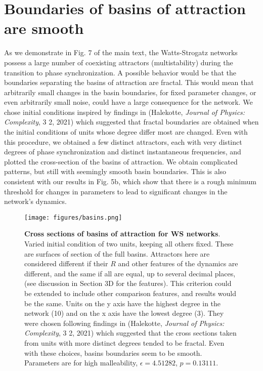\documentclass[reprint,onecolumn,superscriptaddress,showpacs,amsmath,amssymb,aps,prx,floatfix,]{revtex4-2}
\newcommand*{\meanR}{\ensuremath{R}}
\begin{document}
\section{Boundaries of basins of attraction are smooth}

As we demonstrate in Fig. 7 of the main text, the Watts-Strogatz networks possess a large number of coexisting attractors (multistability) during the transition to phase synchronization. A possible behavior would be that the boundaries separating the basins of attraction are fractal. This would mean that arbitrarily small changes in the basin boundaries, for fixed parameter changes, or even arbitrarily small noise, could have a large consequence for the network. We chose initial conditions inspired by findings in (Halekotte, \textit{Journal of Physics: Complexity}, 3 2, 2021) which suggested that fractal boundaries are obtained when the initial conditions of units whose degree differ most are changed. Even with this procedure, we obtained a few distinct attractors, each with very distinct degrees of phase synchronization and distinct instantaneous frequencies, and plotted the cross-section of the basins of attraction. We obtain complicated patterns, but still with seemingly smooth basin boundaries. This is also consistent with our results in Fig. 5b, which show that there is a rough minimum threshold for changes in parameters to lead to significant changes in the network's dynamics.
%
\begin{figure*}[htb]
    \centering
    \texttt{[image: figures/basins.png]}
    \caption{\textbf{Cross sections of basins of attraction  for WS networks}. Varied initial condition of two units, keeping all others fixed. These are surfaces of section of the full basins. Attractors here are considered different if their $\meanR$ and other features of the dynamics are different, and the same if all are equal, up to several decimal places, (see discussion in Section 3D for the features). This criterion could be extended to include other comparison features, and results would be the same. Units on the y axis have the highest degree in the network (10) and on the x axis have the lowest degree (3). They were chosen following findings in (Halekotte, \textit{Journal of Physics: Complexity}, 3 2, 2021) which suggested that the cross sections taken from units with more distinct degrees tended to be fractal. Even with these choices, basins boundaries seem to be smooth. Parameters are for high malleability, $\epsilon = 4.51282$, $p = 0.13111$. }
    \label{sup:fig:basins}
\end{figure*}
\end{document}
